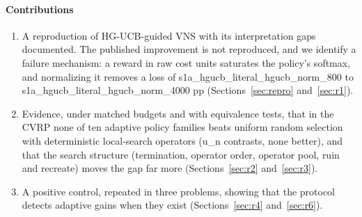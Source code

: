 \paragraph{Contributions}
\begin{enumerate}
\item A reproduction of HG-UCB-guided VNS with its interpretation gaps documented. The published improvement is not reproduced, and we identify a failure mechanism: a reward in raw cost units saturates the policy's softmax, and normalizing it removes a loss of \num{s1a_hgucb_literal_hgucb_norm_800} to \num{s1a_hgucb_literal_hgucb_norm_4000} pp (Sections~\ref{sec:repro} and~\ref{sec:r1}).
\item Evidence, under matched budgets and with equivalence tests, that in the CVRP none of ten adaptive policy families beats uniform random selection with deterministic local-search operators (\num{u_n} contrasts, none better), and that the search structure (termination, operator order, operator pool, ruin and recreate) moves the gap far more (Sections~\ref{sec:r2} and~\ref{sec:r3}).
\item A positive control, repeated in three problems, showing that the protocol detects adaptive gains when they exist (Sections~\ref{sec:r4} and~\ref{sec:r6}).

\end{enumerate}
